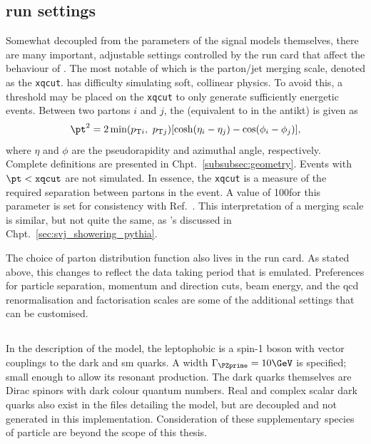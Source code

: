 

\subsection{\texorpdfstring{\MADGRAPH}{MadGraph} run settings}
\label{subsec:svj_mg_run_settings}

Somewhat decoupled from the parameters of the signal models themselves, there are many important, adjustable settings controlled by the run card that affect the behaviour of \MADGRAPH. The most notable of which is the parton/\gls{jet} merging scale, denoted as the \texttt{xqcut}. \MADGRAPH has difficulty simulating soft, collinear physics. To avoid this, a threshold may be placed on the \texttt{xqcut} to only generate sufficiently energetic events. Between two partons $i$ and $j$, the \pt (equivalent to \kt in the \gls{antikt}) is given as
\begin{equation}
    \pt^2 = 2 \min(p_{\mathrm{T}i}, \ p_{\mathrm{T}j}) [\cosh(\eta_i - \eta_j) - \cos(\phi_i - \phi_j)],
    \label{eq:svj_mg_kt}
\end{equation}
where $\eta$ and $\phi$ are the pseudorapidity and azimuthal angle, respectively. Complete definitions are presented in Chpt.~\ref{subsubsec:geometry}. Events with $\pt < \texttt{xqcut}$ are not simulated. In essence, the \texttt{xqcut} is a measure of the required separation between partons in the event. A value of 100\GeV for this parameter is set for consistency with Ref.~. This interpretation of a merging scale is similar, but not quite the same, as \PYTHIA's discussed in Chpt.~\ref{sec:svj_showering_pythia}.

The choice of parton distribution function also lives in the run card. As stated above, this changes to reflect the data taking period that is emulated. Preferences for particle separation, momentum and direction cuts, beam energy, and the \acrshort{qcd} renormalisation and factorisation scales are some of the additional settings that can be customised.




\subsection{\texorpdfstring{\schannel}{s-channel}}
\label{subsec:svj_signal_madgraph_schannel}

In the description of the \schannel model, the leptophobic \PZprime is a spin-1 boson with vector couplings to the dark and \acrshort{sm} quarks. A width $\Gamma_{\PZprime} = \text{10}\GeV$ is specified; small enough to allow its resonant production. The dark quarks themselves are Dirac spinors with dark colour quantum numbers. Real and complex scalar dark quarks also exist in the files detailing the model, but are decoupled and not generated in this implementation. Consideration of these supplementary species of particle are beyond the scope of this thesis.


